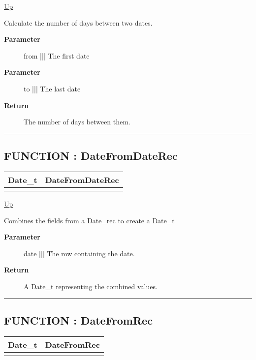 \hyperlink{ecldoc:Date}{Up}

\par
Calculate the number of days between two dates.

\par
\begin{description}
\item [\textbf{Parameter}] from ||| The first date
\item [\textbf{Parameter}] to ||| The last date
\item [\textbf{Return}] The number of days between them.
\end{description}

\rule{\textwidth}{0.4pt}
\subsection*{FUNCTION : DateFromDateRec}
\hypertarget{ecldoc:date.datefromdaterec}{}

{\renewcommand{\arraystretch}{1.5}
\begin{tabularx}{\textwidth}{|>{\raggedright\arraybackslash}l|X|}
\hline
\hspace{0pt}Date\_t & DateFromDateRec \\
\hline
\multicolumn{2}{|>{\raggedright\arraybackslash}X|}{\hspace{0pt}(Date\_rec date)} \\
\hline
\end{tabularx}
}

\hyperlink{ecldoc:Date}{Up}

\par
Combines the fields from a Date\_rec to create a Date\_t

\par
\begin{description}
\item [\textbf{Parameter}] date ||| The row containing the date.
\item [\textbf{Return}] A Date\_t representing the combined values.
\end{description}

\rule{\textwidth}{0.4pt}
\subsection*{FUNCTION : DateFromRec}
\hypertarget{ecldoc:date.datefromrec}{}

{\renewcommand{\arraystretch}{1.5}
\begin{tabularx}{\textwidth}{|>{\raggedright\arraybackslash}l|X|}
\hline
\hspace{0pt}Date\_t & DateFromRec \\
\hline
\multicolumn{2}{|>{\raggedright\arraybackslash}X|}{\hspace{0pt}(Date\_rec date)} \\
\hline
\end{tabularx}
}

